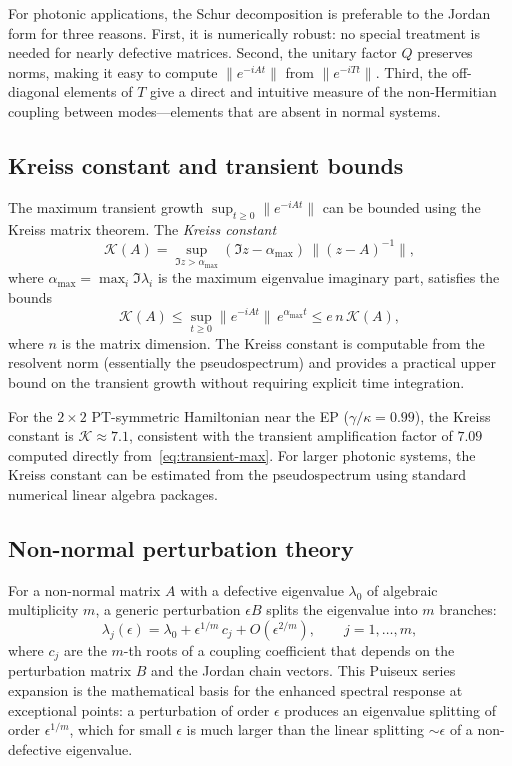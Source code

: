 For photonic applications, the Schur decomposition is preferable to the
Jordan form for three reasons. First, it is numerically robust: no
special treatment is needed for nearly defective matrices. Second, the
unitary factor $Q$ preserves norms, making it easy to compute
$\|e^{-iAt}\|$ from $\|e^{-iTt}\|$. Third, the off-diagonal elements
of $T$ give a direct and intuitive measure of the non-Hermitian coupling
between modes---elements that are absent in normal systems.

\subsection{Kreiss constant and transient bounds}
\label{ssec:kreiss}

The maximum transient growth $\sup_{t \ge 0}\|e^{-iAt}\|$ can be
bounded using the Kreiss matrix theorem. The \emph{Kreiss constant}
\begin{equation}
 \mathcal{K}(A) = \sup_{\Im z > \alpha_{\max}}
 (\Im z - \alpha_{\max})\,\|(z - A)^{-1}\|,
 \label{eq:kreiss-constant}
\end{equation}
where $\alpha_{\max} = \max_i \Im\lambda_i$ is the maximum eigenvalue
imaginary part, satisfies the bounds
\begin{equation}
 \mathcal{K}(A) \le \sup_{t \ge 0} \|e^{-iAt}\|\,e^{\alpha_{\max}t}
 \le e\,n\,\mathcal{K}(A),
 \label{eq:kreiss-bounds}
\end{equation}
where $n$ is the matrix dimension. The Kreiss constant is computable
from the resolvent norm (essentially the pseudospectrum) and provides
a practical upper bound on the transient growth without requiring
explicit time integration.

For the $2\times 2$ PT-symmetric Hamiltonian near the EP
($\gamma/\kappa = 0.99$), the Kreiss constant is
$\mathcal{K} \approx 7.1$, consistent with the transient amplification
factor of $7.09$ computed directly from~\eqref{eq:transient-max}. For
larger photonic systems, the Kreiss constant can be estimated from the
pseudospectrum using standard numerical linear algebra packages.

\subsection{Non-normal perturbation theory}
\label{ssec:nonnormal-perturbation}

For a non-normal matrix $A$ with a defective eigenvalue $\lambda_0$ of
algebraic multiplicity $m$, a generic perturbation $\epsilon B$ splits
the eigenvalue into $m$ branches:
\begin{equation}
 \lambda_j(\epsilon) = \lambda_0
 + \epsilon^{1/m}\,c_j + O(\epsilon^{2/m}),
 \qquad j = 1, \ldots, m,
 \label{eq:puiseux-series}
\end{equation}
where $c_j$ are the $m$-th roots of a coupling coefficient that depends
on the perturbation matrix $B$ and the Jordan chain vectors. This
Puiseux series expansion is the mathematical basis for the enhanced
spectral response at exceptional points: a perturbation of order
$\epsilon$ produces an eigenvalue splitting of order
$\epsilon^{1/m}$, which for small $\epsilon$ is much larger than the
linear splitting $\sim\epsilon$ of a non-defective eigenvalue.

